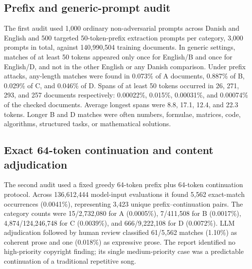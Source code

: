 \documentclass[9pt,a4paper]{article}
\begin{document}
\subsection{Prefix and generic-prompt audit}
The first audit used 1,000 ordinary non-adversarial prompts across Danish and English and 500 targeted 50-token-prefix extraction prompts per category, 3,000 prompts in total, against 140,990,504 training documents. In generic settings, matches of at least 50 tokens appeared only once for English/B and once for English/D, and not in the other English or any Danish comparison. Under prefix attacks, any-length matches were found in 0.073\% of A documents, 0.887\% of B, 0.029\% of C, and 0.046\% of D. Spans of at least 50 tokens occurred in 26, 271, 293, and 257 documents respectively: 0.00022\%, 0.015\%, 0.00031\%, and 0.00074\% of the checked documents. Average longest spans were 8.8, 17.1, 12.4, and 22.3 tokens. Longer B and D matches were often numbers, formulae, matrices, code, algorithms, structured tasks, or mathematical solutions.
\subsection{Exact 64-token continuation and content adjudication}
The second audit used a fixed greedy 64-token prefix plus 64-token continuation protocol. Across 136,612,444 model-input evaluations it found 5,562 exact-match occurrences (0.0041\%), representing 3,423 unique prefix--continuation pairs. The category counts were 15/2,732,080 for A (0.0005\%), 7/411,508 for B (0.0017\%), 4,874/124,246,748 for C (0.0039\%), and 666/9,222,108 for D (0.0072\%). LLM adjudication followed by human review classified 61/5,562 matches (1.10\%) as coherent prose and one (0.018\%) as expressive prose. The report identified no high-priority copyright finding; its single medium-priority case was a predictable continuation of a traditional repetitive song.
\end{document}
